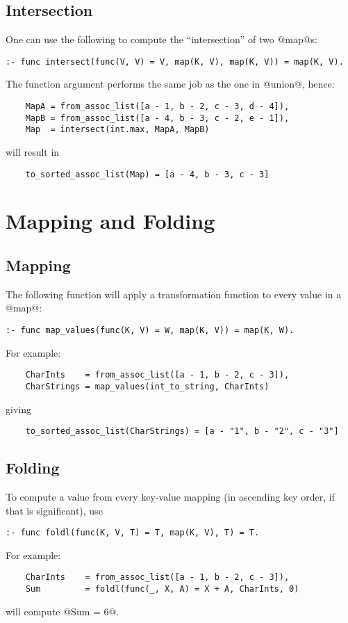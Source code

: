 \subsection{Intersection}

One can use the following to compute the ``intersection'' of two @map@s:
\begin{verbatim}
:- func intersect(func(V, V) = V, map(K, V), map(K, V)) = map(K, V).
\end{verbatim}
The function argument performs the same job as the one in @union@,
hence:
\begin{verbatim}
    MapA = from_assoc_list([a - 1, b - 2, c - 3, d - 4]),
    MapB = from_assoc_list([a - 4, b - 3, c - 2, e - 1]),
    Map  = intersect(int.max, MapA, MapB)
\end{verbatim}
will result in
\begin{verbatim}
    to_sorted_assoc_list(Map) = [a - 4, b - 3, c - 3]
\end{verbatim}

\section{Mapping and Folding}

\subsection{Mapping}

The following function will apply a transformation function to every
value in a @map@:
\begin{verbatim}
:- func map_values(func(K, V) = W, map(K, V)) = map(K, W).
\end{verbatim}
For example:
\begin{verbatim}
    CharInts    = from_assoc_list([a - 1, b - 2, c - 3]),
    CharStrings = map_values(int_to_string, CharInts)
\end{verbatim}
giving
\begin{verbatim}
    to_sorted_assoc_list(CharStrings) = [a - "1", b - "2", c - "3"]
\end{verbatim}

\subsection{Folding}

To compute a value from every key-value mapping (in ascending key order,
if that is significant), use
\begin{verbatim}
:- func foldl(func(K, V, T) = T, map(K, V), T) = T.
\end{verbatim}
For example:
\begin{verbatim}
    CharInts    = from_assoc_list([a - 1, b - 2, c - 3]),
    Sum         = foldl(func(_, X, A) = X + A, CharInts, 0)
\end{verbatim}
will compute @Sum = 6@.

